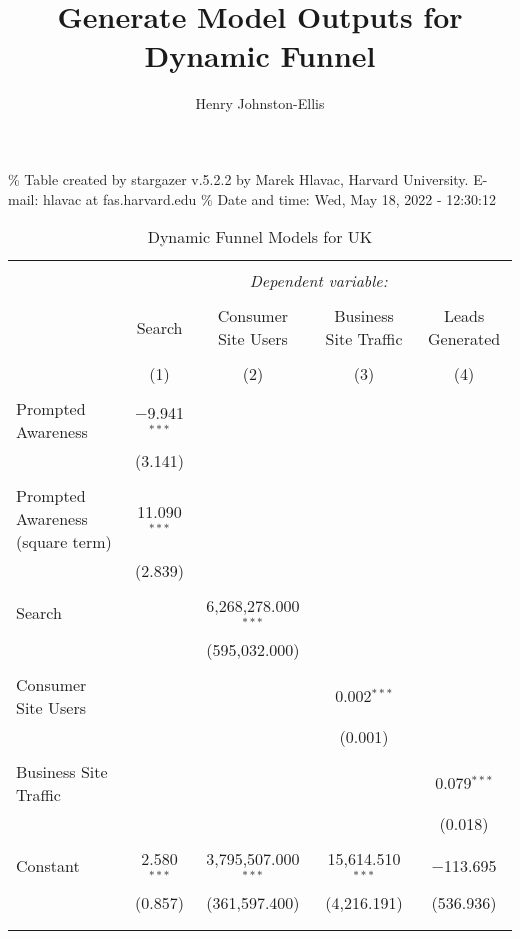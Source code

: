\documentclass[
  landscape]{article}
\title{Generate Model Outputs for Dynamic Funnel}
\author{Henry Johnston-Ellis}
\date{}
\begin{document}
\maketitle

{
\setcounter{tocdepth}{2}
\tableofcontents
}
\% Table created by stargazer v.5.2.2 by Marek Hlavac, Harvard
University. E-mail: hlavac at fas.harvard.edu \% Date and time: Wed, May
18, 2022 - 12:30:12

\begin{table}[!htbp] \centering 
  \caption{Dynamic Funnel Models for UK} 
  \label{} 
\begin{tabular}{@{\extracolsep{5pt}}lcccc} 
\\[-1.8ex]\hline 
\hline \\[-1.8ex] 
 & \multicolumn{4}{c}{\textit{Dependent variable:}} \\ 
\cline{2-5} 
\\[-1.8ex] & Search & Consumer Site Users & Business Site Traffic & Leads Generated \\ 
\\[-1.8ex] & (1) & (2) & (3) & (4)\\ 
\hline \\[-1.8ex] 
 Prompted Awareness & $-$9.941$^{***}$ &  &  &  \\ 
  & (3.141) &  &  &  \\ 
  & & & & \\ 
 Prompted Awareness (square term) & 11.090$^{***}$ &  &  &  \\ 
  & (2.839) &  &  &  \\ 
  & & & & \\ 
 Search &  & 6,268,278.000$^{***}$ &  &  \\ 
  &  & (595,032.000) &  &  \\ 
  & & & & \\ 
 Consumer Site Users &  &  & 0.002$^{***}$ &  \\ 
  &  &  & (0.001) &  \\ 
  & & & & \\ 
 Business Site Traffic &  &  &  & 0.079$^{***}$ \\ 
  &  &  &  & (0.018) \\ 
  & & & & \\ 
 Constant & 2.580$^{***}$ & 3,795,507.000$^{***}$ & 15,614.510$^{***}$ & $-$113.695 \\ 
  & (0.857) & (361,597.400) & (4,216.191) & (536.936) \\ 
  & & & & \\ 
\hline \\[-1.8ex] 

\end{tabular}
\end{table}
\end{document}
